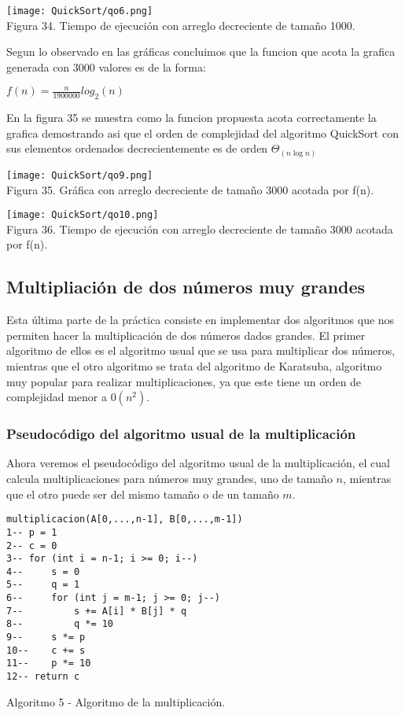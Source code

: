 \documentclass[12pt,twoside]{article}
\begin{document}
\begin{center}
    \texttt{[image: QuickSort/qo6.png]}\\
    Figura 34. Tiempo de ejecuci\'on con arreglo decreciente de tamaño 1000.
\end{center}
Segun lo observado en las gr\'aficas concluimos que la funcion que acota la grafica generada con 3000 valores es de la forma:
\begin{center}
    $f(n) = \frac{n}{1900000}log_2(n)$
\end{center}
En la figura 35 se muestra como la funcion propuesta acota correctamente la grafica demostrando asi que el orden de complejidad del algoritmo QuickSort con sus elementos ordenados decrecientemente es de orden  $\Theta_{(n \log n)}$
\begin{center}
    \texttt{[image: QuickSort/qo9.png]}\\
    Figura 35. Gr\'afica con arreglo decreciente de tamaño 3000 acotada por f(n).
\end{center}
\begin{center}
    \texttt{[image: QuickSort/qo10.png]}\\
    Figura 36. Tiempo de ejecuci\'on con arreglo decreciente de tamaño 3000 acotada por f(n).
\end{center}
\subsection{Multipliación de dos números muy grandes}
Esta última parte de la práctica consiste en implementar dos algoritmos que nos permiten hacer la multiplicación de dos números dados grandes. El primer algoritmo de ellos es el algoritmo usual que se usa para multiplicar dos números, mientras que el otro algoritmo se trata del algoritmo de Karatsuba, algoritmo muy popular para realizar multiplicaciones, ya que este tiene un orden de complejidad menor a $0(n^2)$.

\subsubsection{Pseudocódigo del algoritmo usual de la multiplicación}
Ahora veremos el pseudocódigo del algoritmo usual de la multiplicación, el cual calcula multiplicaciones para números muy grandes, uno de tamaño $n$, mientras que el otro puede ser del mismo tamaño o de un tamaño $m$.
\begin{lstlisting}
multiplicacion(A[0,...,n-1], B[0,...,m-1])
1-- p = 1
2-- c = 0
3-- for (int i = n-1; i >= 0; i--)
4--     s = 0
5--     q = 1
6--     for (int j = m-1; j >= 0; j--)
7--         s += A[i] * B[j] * q
8--         q *= 10
9--     s *= p
10--    c += s
11--    p *= 10
12-- return c
\end{lstlisting}
\begin{center}
    Algoritmo 5 - Algoritmo de la multiplicación.
\end{center}
\end{document}
